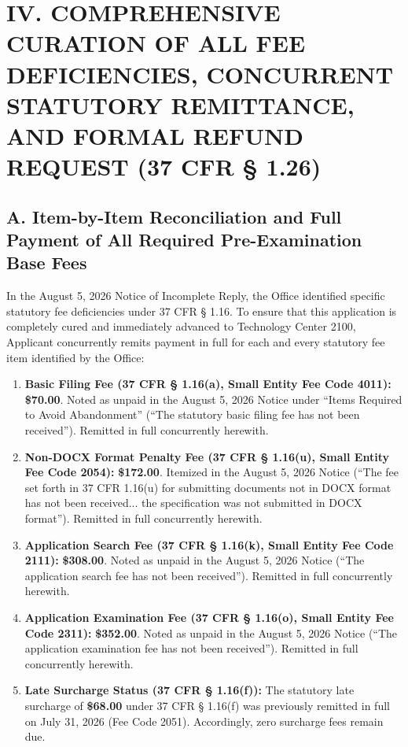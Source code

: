 \documentclass[11pt,letterpaper]{article}
\begin{document}
\section*{IV. COMPREHENSIVE CURATION OF ALL FEE DEFICIENCIES, CONCURRENT STATUTORY REMITTANCE, AND FORMAL REFUND REQUEST (37 CFR \S{} 1.26)}

\subsection*{A. Item-by-Item Reconciliation and Full Payment of All Required Pre-Examination Base Fees}
In the August 5, 2026 Notice of Incomplete Reply, the Office identified specific statutory fee deficiencies under 37 CFR \S{} 1.16. To ensure that this application is completely cured and immediately advanced to Technology Center 2100, Applicant concurrently remits payment in full for each and every statutory fee item identified by the Office:

\begin{enumerate}[leftmargin=*]
    \item \textbf{Basic Filing Fee (37 CFR \S{} 1.16(a), Small Entity Fee Code 4011):} \textbf{\$70.00}. Noted as unpaid in the August 5, 2026 Notice under ``Items Required to Avoid Abandonment'' (``The statutory basic filing fee has not been received''). Remitted in full concurrently herewith.
    
    \item \textbf{Non-DOCX Format Penalty Fee (37 CFR \S{} 1.16(u), Small Entity Fee Code 2054):} \textbf{\$172.00}. Itemized in the August 5, 2026 Notice (``The fee set forth in 37 CFR 1.16(u) for submitting documents not in DOCX format has not been received... the specification was not submitted in DOCX format''). Remitted in full concurrently herewith.
    
    \item \textbf{Application Search Fee (37 CFR \S{} 1.16(k), Small Entity Fee Code 2111):} \textbf{\$308.00}. Noted as unpaid in the August 5, 2026 Notice (``The application search fee has not been received''). Remitted in full concurrently herewith.
    
    \item \textbf{Application Examination Fee (37 CFR \S{} 1.16(o), Small Entity Fee Code 2311):} \textbf{\$352.00}. Noted as unpaid in the August 5, 2026 Notice (``The application examination fee has not been received''). Remitted in full concurrently herewith.

    \item \textbf{Late Surcharge Status (37 CFR \S{} 1.16(f)):} The statutory late surcharge of \textbf{\$68.00} under 37 CFR \S{} 1.16(f) was previously remitted in full on July 31, 2026 (Fee Code 2051). Accordingly, zero surcharge fees remain due.
\end{enumerate}
\end{document}
